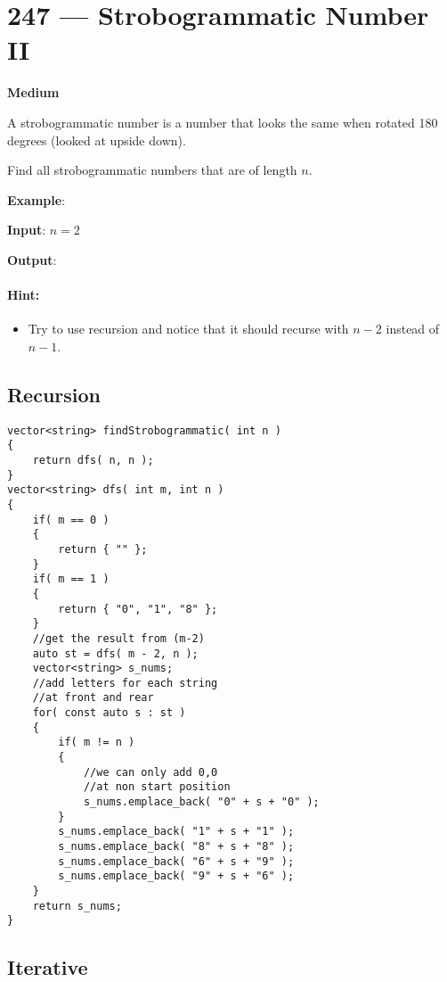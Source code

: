 \section{247 --- Strobogrammatic Number II}

\textbf{Medium}

A strobogrammatic number is a number that looks the same when rotated 180 degrees (looked at upside down).

Find all strobogrammatic numbers that are of length $n$.

\begin{flushleft}
\textbf{Example}:

\textbf{Input}:  $ n = 2 $

\textbf{Output}: \fcj{["11","69","88","96"]}
\end{flushleft}


\paragraph{Hint:}
\begin{itemize}
\item Try to use recursion and notice that it should recurse with $n - 2$ instead of $n - 1$.
\end{itemize}

\subsection{Recursion}

\setcounter{lstlisting}{0}
\begin{lstlisting}[style=customc, caption={Recursion}]
vector<string> findStrobogrammatic( int n )
{
    return dfs( n, n );
}
vector<string> dfs( int m, int n )
{
    if( m == 0 )
    {
        return { "" };
    }
    if( m == 1 )
    {
        return { "0", "1", "8" };
    }
    //get the result from (m-2)
    auto st = dfs( m - 2, n );
    vector<string> s_nums;
    //add letters for each string
    //at front and rear
    for( const auto s : st )
    {
        if( m != n )
        {
            //we can only add 0,0
            //at non start position
            s_nums.emplace_back( "0" + s + "0" );
        }
        s_nums.emplace_back( "1" + s + "1" );
        s_nums.emplace_back( "8" + s + "8" );
        s_nums.emplace_back( "6" + s + "9" );
        s_nums.emplace_back( "9" + s + "6" );
    }
    return s_nums;
}
\end{lstlisting}

\subsection{Iterative}

